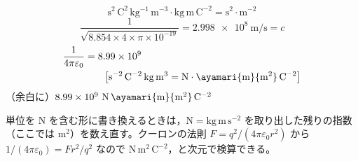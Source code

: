 \[ \mathrm{s^{2}\,C^{2}\,kg^{-1}\,m^{-3}}\cdot\mathrm{kg\,m\,C^{-2}}=\mathrm{s^{2}\cdot m^{-2}} \]
\[ \frac{1}{\sqrt{8.854\times4\times\pi\times10^{-19}}}=\qty{2.998e8}{\metre\per\second}=c \]
\begin{align*}
\frac{1}{4\pi\varepsilon_{0}}&=8.99\times10^{9}\\
&\qquad\bigl[\mathrm{s^{-2}\,C^{-2}\,kg\,m^{3}}=\mathrm{N}\cdot\ayamari{\mathrm{m}}{\mathrm{m}^{2}}\,\mathrm{C}^{-2}\bigr]
\end{align*}
（余白に）$8.99\times10^{9}\ \mathrm{N}\,\ayamari{\mathrm{m}}{\mathrm{m}^{2}}\,\mathrm{C}^{-2}$
\item 単位を \unit{\newton} を含む形に書き換えるときは，$\unit{\newton}=\mathrm{kg\,m\,s^{-2}}$ を取り出した残りの指数（ここでは $\mathrm{m^{2}}$）を数え直す。クーロンの法則 $F=q^{2}/(4\pi\varepsilon_{0}r^{2})$ から $1/(4\pi\varepsilon_{0})=Fr^{2}/q^{2}$ なので $\mathrm{N\,m^{2}\,C^{-2}}$，と次元で検算できる。
